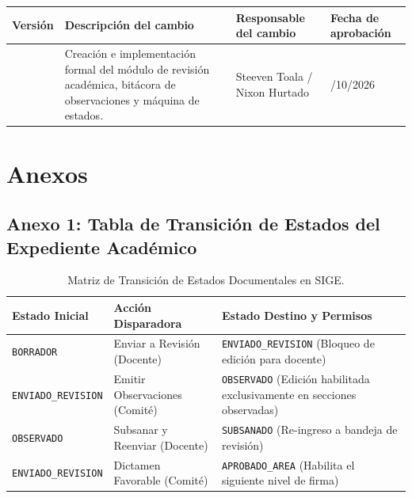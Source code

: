 \documentclass[12pt,a4paper]{article}
\begin{document}
\noindent
\renewcommand{\arraystretch}{1.2}
\begin{tabularx}{\textwidth}{|>{\hsize=0.45\hsize\centering\arraybackslash}X|>{\hsize=1.55\hsize\raggedright\arraybackslash}X|>{\hsize=1.2\hsize\raggedright\arraybackslash}X|>{\hsize=0.8\hsize\centering\arraybackslash}X|}
    \hline
    \rowcolor{tableheader}
    \textbf{Versión} & \textbf{Descripción del cambio} & \textbf{Responsable del cambio} & \textbf{Fecha de aprobación} \\
    \hline
    1.0 & Creación e implementación formal del módulo de revisión académica, bitácora de observaciones y máquina de estados. & Steeven Toala / Nixon Hurtado & 02/10/2026 \\
    \hline
\end{tabularx}

\vspace{0.4cm}

\section{Anexos}

\subsection*{Anexo 1: Tabla de Transición de Estados del Expediente Académico}
\begin{table}[H]
\centering
\small
\begin{tabularx}{\textwidth}{|l|l|X|}
\hline
\rowcolor{tableheader}
\textbf{Estado Inicial} & \textbf{Acción Disparadora} & \textbf{Estado Destino y Permisos} \\ \hline
\texttt{BORRADOR} & Enviar a Revisión (Docente) & \texttt{ENVIADO\_REVISION} (Bloqueo de edición para docente) \\ \hline
\texttt{ENVIADO\_REVISION} & Emitir Observaciones (Comité) & \texttt{OBSERVADO} (Edición habilitada exclusivamente en secciones observadas) \\ \hline
\texttt{OBSERVADO} & Subsanar y Reenviar (Docente) & \texttt{SUBSANADO} (Re-ingreso a bandeja de revisión) \\ \hline
\texttt{ENVIADO\_REVISION} & Dictamen Favorable (Comité) & \texttt{APROBADO\_AREA} (Habilita el siguiente nivel de firma) \\ \hline
\end{tabularx}
\caption{Matriz de Transición de Estados Documentales en SIGE.}
\label{tab:estados_transicion}
\end{table}
\end{document}
